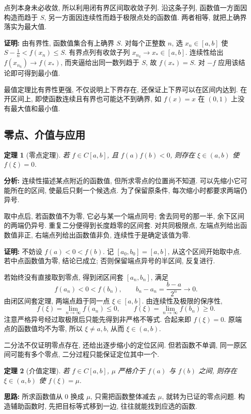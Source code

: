\documentclass[UTF8,openany]{ctexbook}
\theoremstyle{chinesetextbook}
\newtheorem{theorem}{定理}[section]
\newenvironment{cnproof}{\par\indent\textbf{证明:} \ignorespaces}{\par}
\begin{document}
点列本身未必收敛, 所以利用闭有界区间取收敛子列. 沿这条子列, 函数值一方面因构造而趋于 $S$, 另一方面因连续性而趋于极限点处的函数值. 两者相等, 就把上确界落实为最大值.

\begin{cnproof}
由有界性, 函数值集合有上确界 $S$. 对每个正整数 $n$, 选 $x_n\in[a,b]$ 使 $\displaystyle S-\frac1n<f(x_n)\le S$. 有界点列有收敛子列 $x_{n_k}\to x_*\in[a,b]$. 连续性给出 $f(x_{n_k})\to f(x_*)$, 而夹逼给出同一数列趋于 $S$, 故 $f(x_*)=S$. 对 $-f$ 应用该结论即可得到最小值.
\end{cnproof}
最值定理比有界性更强, 不仅说明上下界存在, 还保证上下界可以在区间内达到. 在开区间上, 即使函数连续且有界也可能达不到确界, 如 $f(x)=x$ 在 $(0,1)$ 上没有最大值和最小值.
\subsection{零点、介值与应用}
\begin{theorem}[零点定理]
若 $f\in C[a,b]$, 且 $f(a)f(b)<0$, 则存在 $\xi\in(a,b)$ 使 $f(\xi)=0$.
\end{theorem}
\par\indent\textbf{分析:} 连续性描述某点附近的函数值, 但所求零点的位置尚不知道. 可以先缩小它可能所在的区间, 使最后只剩一个候选点. 为了保留原条件, 每次缩小时都要求两端仍异号.

取中点后, 若函数值不为零, 它必与某一个端点同号; 舍去同号的那一半, 余下区间的两端仍异号. 重复二分便得到长度趋零的区间套. 对共同极限点, 左端点列给出函数值非正, 右端点列给出函数值非负, 连续性于是确定该值为零.

\begin{cnproof}
不妨设 $f(a)<0<f(b)$. 记 $[a_0,b_0]=[a,b]$, 从这个区间开始取中点. 若中点函数值为零, 结论已成立; 否则保留端点异号的半区间, 反复进行.

若始终没有直接取到零点, 得到闭区间套 $[a_n,b_n]$, 满足
\[
f(a_n)<0<f(b_n),\qquad b_n-a_n=\frac{b-a}{2^n}\to0.
\]
由闭区间套定理, 两端点趋于同一点 $\xi\in[a,b]$. 由连续性及极限的保序性,
\[
f(\xi)=\lim_{n\to\infty}f(a_n)\le0,\qquad
f(\xi)=\lim_{n\to\infty}f(b_n)\ge0.
\]
注意严格异号经过取极限后只能先得到非严格不等式. 合起来即 $f(\xi)=0$. 原端点的函数值均不为零, 所以 $\xi\ne a,b$, 从而 $\xi\in(a,b)$.
\end{cnproof}
二分法不仅证明零点存在, 还给出逐步缩小的定位区间. 但若函数不单调, 同一原区间可能有多个零点, 二分过程只能保证定位其中一个.
\begin{theorem}[介值定理]
若 $f\in C[a,b]$, $\mu$ 严格介于 $f(a)$ 与 $f(b)$ 之间, 则存在 $\xi\in(a,b)$ 使 $f(\xi)=\mu$.
\end{theorem}
\par\indent\textbf{思路:} 所求函数值从 $0$ 换成 $\mu$, 只需把函数整体减去 $\mu$, 就转为已证的零点问题. 构造辅助函数时, 先把目标等式移到一边, 往往就能找到应选的函数.
\end{document}
